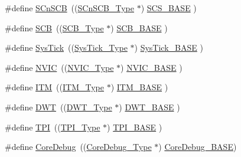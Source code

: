 \begin{DoxyCompactItemize}
\item 
\#define \hyperlink{group___c_m_s_i_s__core__base_ga9fe0cd2eef83a8adad94490d9ecca63f}{S\+Cn\+S\+CB}~((\hyperlink{struct_s_cn_s_c_b___type}{S\+Cn\+S\+C\+B\+\_\+\+Type}    $\ast$)     \hyperlink{group___c_m_s_i_s__core__base_ga3c14ed93192c8d9143322bbf77ebf770}{S\+C\+S\+\_\+\+B\+A\+SE}      )
\item 
\#define \hyperlink{group___c_m_s_i_s__core__base_gaaaf6477c2bde2f00f99e3c2fd1060b01}{S\+CB}~((\hyperlink{struct_s_c_b___type}{S\+C\+B\+\_\+\+Type}       $\ast$)     \hyperlink{group___c_m_s_i_s__core__base_gad55a7ddb8d4b2398b0c1cfec76c0d9fd}{S\+C\+B\+\_\+\+B\+A\+SE}      )
\item 
\#define \hyperlink{group___c_m_s_i_s__core__base_gacd96c53beeaff8f603fcda425eb295de}{Sys\+Tick}~((\hyperlink{struct_sys_tick___type}{Sys\+Tick\+\_\+\+Type}   $\ast$)     \hyperlink{group___c_m_s_i_s__core__base_ga58effaac0b93006b756d33209e814646}{Sys\+Tick\+\_\+\+B\+A\+SE}  )
\item 
\#define \hyperlink{group___c_m_s_i_s__core__base_gac8e97e8ce56ae9f57da1363a937f8a17}{N\+V\+IC}~((\hyperlink{struct_n_v_i_c___type}{N\+V\+I\+C\+\_\+\+Type}      $\ast$)     \hyperlink{group___c_m_s_i_s__core__base_gaa0288691785a5f868238e0468b39523d}{N\+V\+I\+C\+\_\+\+B\+A\+SE}     )
\item 
\#define \hyperlink{group___c_m_s_i_s__core__base_gabae7cdf882def602cb787bb039ff6a43}{I\+TM}~((\hyperlink{struct_i_t_m___type}{I\+T\+M\+\_\+\+Type}       $\ast$)     \hyperlink{group___c_m_s_i_s__core__base_gadd76251e412a195ec0a8f47227a8359e}{I\+T\+M\+\_\+\+B\+A\+SE}      )
\item 
\#define \hyperlink{group___c_m_s_i_s__core__base_gabbe5a060185e1d5afa3f85b14e10a6ce}{D\+WT}~((\hyperlink{struct_d_w_t___type}{D\+W\+T\+\_\+\+Type}       $\ast$)     \hyperlink{group___c_m_s_i_s__core__base_gafdab534f961bf8935eb456cb7700dcd2}{D\+W\+T\+\_\+\+B\+A\+SE}      )
\item 
\#define \hyperlink{group___c_m_s_i_s__core__base_ga8b4dd00016aed25a0ea54e9a9acd1239}{T\+PI}~((\hyperlink{struct_t_p_i___type}{T\+P\+I\+\_\+\+Type}       $\ast$)     \hyperlink{group___c_m_s_i_s__core__base_ga2b1eeff850a7e418844ca847145a1a68}{T\+P\+I\+\_\+\+B\+A\+SE}      )
\item 
\#define \hyperlink{group___c_m_s_i_s__core__base_gab6e30a2b802d9021619dbb0be7f5d63d}{Core\+Debug}~((\hyperlink{struct_core_debug___type}{Core\+Debug\+\_\+\+Type} $\ast$)     \hyperlink{group___c_m_s_i_s__core__base_ga680604dbcda9e9b31a1639fcffe5230b}{Core\+Debug\+\_\+\+B\+A\+SE})

\end{DoxyCompactItemize}
